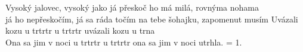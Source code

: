 \ve{}
Vysoký jalovec, vysoký jako já
přeskoč ho má milá, rovnýma nohama\\
já ho nepřeskočím, já sa ráda točím
na tebe šohajku, zapomenut musím
\cho{}
Uvázali kozu u trtrtr u trtrtr
uvázali kozu u trna\\
Ona sa jim v noci u trtrtr u trtrtr
ona sa jim v noci utrhla.
\ve{}
= 1.
\cho{}
\esong{}
